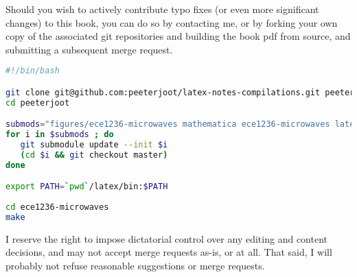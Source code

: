 %
%

Should you wish to actively contribute typo fixes (or even more significant changes) to this book, you can do so by contacting me, or by forking your own copy of the associated git repositories and building the book pdf from source, and submitting a subsequent merge request.

\begin{lstlisting}[language=bash]
#!/bin/bash

git clone git@github.com:peeterjoot/latex-notes-compilations.git peeterjoot
cd peeterjoot

submods="figures/ece1236-microwaves mathematica ece1236-microwaves latex"
for i in $submods ; do
   git submodule update --init $i
   (cd $i && git checkout master)
done

export PATH=`pwd`/latex/bin:$PATH
 
cd ece1236-microwaves
make
\end{lstlisting}

I reserve the right to impose dictatorial control over any editing and content decisions, and may not accept merge requests as-is, or at all. That said, I will probably not refuse reasonable suggestions or merge requests.
